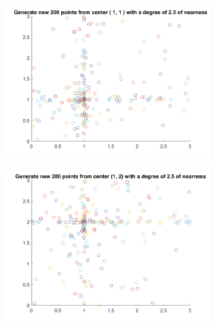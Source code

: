 \begin{figure}
  \centering
  \begin{subfigure}[b]{0.4\textwidth}
    \includegraphics[width=\textwidth]{img/cbr-0}
    \label{fig:cbr-0}
  \end{subfigure}
  \begin{subfigure}[b]{0.4\textwidth}
    \includegraphics[width=\textwidth]{img/cbr-1}
    \label{fig:cbr-1}
  \end{subfigure}


\end{figure}
